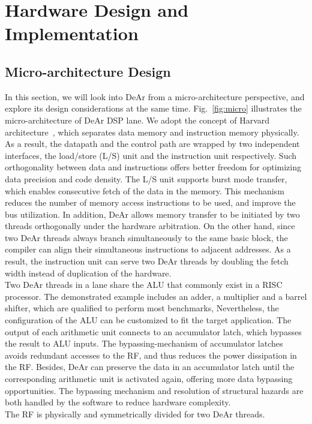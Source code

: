 \section{Hardware Design and Implementation}
\subsection{Micro-architecture Design}
In this section, we will look into DeAr from a micro-architecture perspective, and explore its design considerations at the same time.
Fig.~\ref{fig:micro} illustrates the micro-architecture of DeAr DSP lane.
We adopt the concept of Harvard architecture~\cite{harvard}, 
which separates data memory and instruction memory physically.
As a result, the datapath and the control path are wrapped by two independent interfaces, the load/store (L/S) unit and the instruction unit respectively.
Such orthogonality between data and instructions offers better freedom for optimizing data precision and code density.
The L/S unit supports burst mode transfer, which enables consecutive fetch of the data in the memory.
This mechanism reduces the number of memory access instructions to be used, 
and improve the bus utilization.
In addition, DeAr allows memory transfer to be initiated by two threads orthogonally under the hardware arbitration.
On the other hand, since two DeAr threads always branch simultaneously to the same basic block, 
the compiler can align their simultaneous instructions to adjacent addresses.
As a result, the instruction unit can serve two DeAr threads by doubling the fetch width instead of duplication of the hardware.
\\\indent
Two DeAr threads in a lane share the ALU that commonly exist in a RISC processor.
The demonstrated example includes an adder, a multiplier and a barrel shifter, which are qualified to perform most benchmarks,
Nevertheless, the configuration of the ALU can be customized to fit the target application.
The output of each arithmetic unit connects to an accumulator latch, 
which bypasses the result to ALU inputs.
The bypassing-mechanism of accumulator latches avoids redundant accesses to the RF, 
and thus reduces the power dissipation in the RF.
Besides, DeAr can preserve the data in an accumulator latch until the corresponding arithmetic unit is activated again, 
offering more data bypassing opportunities.
The bypassing mechanism and resolution of structural hazards are both handled by the software to reduce hardware complexity.
\\\indent
The RF is physically and symmetrically divided for two DeAr threads.
